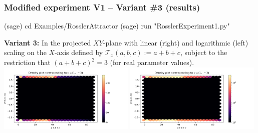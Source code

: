 \documentclass[usenames,svgnames,dvipsnames,10pt]{beamer}
\begin{document}
\begin{frame}[fragile]
\frametitle{Modified experiment V1 -- Variant \#3 (results)}

\begin{center}
\begin{code}
(sage) cd Examples/RosslerAttractor
(sage) run "RosslerExperiment1.py"
\end{code}
\textbf{Variant 3:} 
In the projected $XY$-plane with linear (right) and logarithmic (left) scaling on the $X$-axis defined by 
$\mathcal{T}_x(a, b, c) := a + b + c$, subject to the restriction that 
$(a+b+c)^2 = 3$ (for real parameter values). \\ 
\includegraphics[width=0.49\textwidth]{../Images/RosslerAttractorExpt1-Variant3-linearscale-TypeXY-2021-10-27-042004.png}
\includegraphics[width=0.49\textwidth]{../Images/RosslerAttractorExpt1-Variant3-logscale-TypeXY-2021-10-27-033310.png}
\end{center}

\end{frame}
\end{document}
